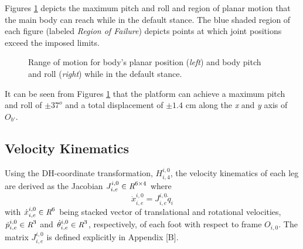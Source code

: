 			Figures \ref{fig::pos_and_ori_rom} depicts the maximum pitch and roll and region of planar motion that the main body can reach while in the default stance. The blue shaded region of each figure (labeled \emph{Region of Failure}) depicts points at which joint positions exceed the imposed limits.
			\begin{figure}[h!]
				\centering
				\caption{Range of motion for body's planar position (\emph{left}) and body pitch and roll (\emph{right}) while in the default stance.}
				\label{fig::pos_and_ori_rom}
			\end{figure}
			It can be seen from Figures \ref{fig::pos_and_ori_rom} that the platform can achieve a maximum pitch and roll of  $\pm37^o$ and a total displacement of $\pm 1.4 \text{ cm}$ along the \emph{x} and \emph{y} axis of $O_{b'}$.


		\subsection{Velocity Kinematics}

			Using the DH-coordinate transformation, ${H}^{i,0}_{i,4}$, the velocity kinematics of each \Ith leg are derived as the Jacobian $J^{i,0}_{i,e} \in\emph{R}^{6\times4}$ where 
	\begin{equation}
		\dot{x}^{i,0}_{i,e} = J^{i,0}_{i,e}  \dot{q}_{i}
		\label{eq::leg_jacobian}
	\end{equation}
with $\dot{x}^{i,0}_{i,e} \in\emph{R}^{6}$ being stacked vector of translational and rotational velocities, $\dot{p}_{i,e}^{i,0} \in\emph{R}^{3}$ and $\dot{\theta}_{i,e}^{i,0}\in\emph{R}^{3}$, respectively, of each \Ith foot with respect to frame $O_{i,0}$. The matrix $J^{i,0}_{i,e}$ is defined explicitly in Appendix [B].

